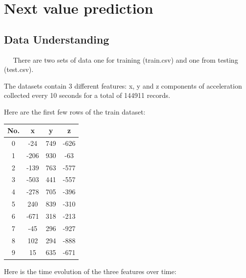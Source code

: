 \chapter*{Next value prediction}

\section*{Data Understanding}\label{Data Understanding}

~~ There are two sets of data one for training (train.csv) and one from testing (test.csv).

The datasets contain 3 different features: x, y and z components of acceleration collected every 10 seconds for a total of 144911 records. 

Here are the first few rows of the train dataset:

\begin{center}
\begin{tabular}{| c | c | c | c |} 
\hline
No. & x & y & z \\ [0.5ex] 
\hline
\hline
 0 & -24 & 749 & -626 \\
\hline
1 & -206 & 930 &  -63 \\
\hline
2 & -139 & 763 & -577 \\
\hline
3 & -503 & 441 & -557 \\
\hline
4 & -278 & 705 & -396 \\
\hline
5 &  240 & 839 & -310 \\
\hline
6 & -671 & 318 & -213 \\
\hline
7  & -45 & 296 & -927 \\
\hline
8 &  102 & 294 & -888 \\
\hline
9 &   15 & 635 & -671 \\ [1ex] 
\hline
\end{tabular}
\end{center}

Here is the time evolution of the three features over time:

